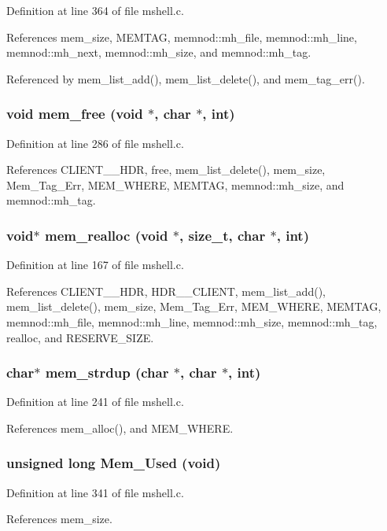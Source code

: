 Definition at line 364 of file mshell.c.

References mem\_\-size, MEMTAG, memnod::mh\_\-file, memnod::mh\_\-line, memnod::mh\_\-next, memnod::mh\_\-size, and memnod::mh\_\-tag.

Referenced by mem\_\-list\_\-add(), mem\_\-list\_\-delete(), and mem\_\-tag\_\-err().
\subsubsection{\setlength{\rightskip}{0pt plus 5cm}void mem\_\-free (void $\ast$, char $\ast$, int)}\label{mshell_8h_a11}




Definition at line 286 of file mshell.c.

References CLIENT\_\_\-HDR, free, mem\_\-list\_\-delete(), mem\_\-size, Mem\_\-Tag\_\-Err, MEM\_\-WHERE, MEMTAG, memnod::mh\_\-size, and memnod::mh\_\-tag.
\subsubsection{\setlength{\rightskip}{0pt plus 5cm}void$\ast$ mem\_\-realloc (void $\ast$, size\_\-t, char $\ast$, int)}\label{mshell_8h_a10}




Definition at line 167 of file mshell.c.

References CLIENT\_\_\-HDR, HDR\_\_\-CLIENT, mem\_\-list\_\-add(), mem\_\-list\_\-delete(), mem\_\-size, Mem\_\-Tag\_\-Err, MEM\_\-WHERE, MEMTAG, memnod::mh\_\-file, memnod::mh\_\-line, memnod::mh\_\-size, memnod::mh\_\-tag, realloc, and RESERVE\_\-SIZE.
\subsubsection{\setlength{\rightskip}{0pt plus 5cm}char$\ast$ mem\_\-strdup (char $\ast$, char $\ast$, int)}\label{mshell_8h_a12}




Definition at line 241 of file mshell.c.

References mem\_\-alloc(), and MEM\_\-WHERE.
\subsubsection{\setlength{\rightskip}{0pt plus 5cm}unsigned long Mem\_\-Used (void)}\label{mshell_8h_a7}




Definition at line 341 of file mshell.c.

References mem\_\-size.